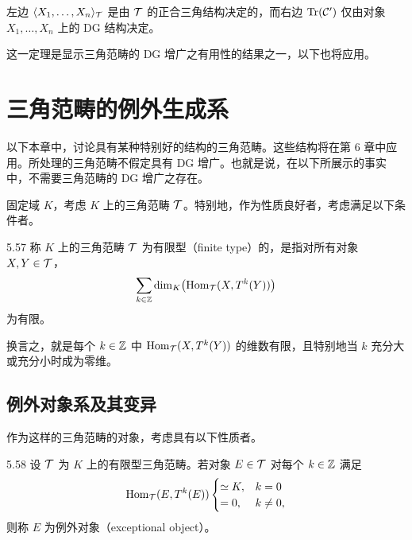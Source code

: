 左边 $\langle X_{1},\ldots,X_{n}\rangle_{\mathcal{T}}$ 是由 $\mathcal{T}$ 的正合三角结构决定的，而右边 $\operatorname{Tr}(\mathcal{C}')$ 仅由对象 $X_{1},\ldots,X_{n}$ 上的 DG 结构决定。

这一定理是显示三角范畴的 DG 增广之有用性的结果之一，以下也将应用。


\section{三角范畴的例外生成系}

以下本章中，讨论具有某种特别好的结构的三角范畴。这些结构将在第 6 章中应用。所处理的三角范畴不假定具有 DG 增广。也就是说，在以下所展示的事实中，不需要三角范畴的 DG 增广之存在。

固定域 $K$，考虑 $K$ 上的三角范畴 $\mathcal{T}$。特别地，作为性质良好者，考虑满足以下条件者。

\begin{definition}{5.57} 称 $K$ 上的三角范畴 $\mathcal{T}$ 为有限型（finite type）的，是指对所有对象 $X,Y \in \mathcal{T}$，
\[
  \sum_{k\in\mathbb{Z}}\dim_{K}\bigl(\operatorname{Hom}_{\mathcal{T}}(X,T^{k}(Y))\bigr)
\]
为有限。\end{definition}

换言之，就是每个 $k \in \mathbb{Z}$ 中 $\operatorname{Hom}_{\mathcal{T}}(X,T^{k}(Y))$ 的维数有限，且特别地当 $k$ 充分大或充分小时成为零维。


\subsection{例外对象系及其变异}

作为这样的三角范畴的对象，考虑具有以下性质者。

\begin{definition}{5.58} 设 $\mathcal{T}$ 为 $K$ 上的有限型三角范畴。若对象 $E \in \mathcal{T}$ 对每个 $k \in \mathbb{Z}$ 满足
\[
  \operatorname{Hom}_{\mathcal{T}}(E,T^{k}(E))
  \begin{cases}
    \simeq K, & k = 0\\
    = 0, & k \ne 0,
  \end{cases}
\]
则称 $E$ 为例外对象（exceptional object）。\end{definition}

